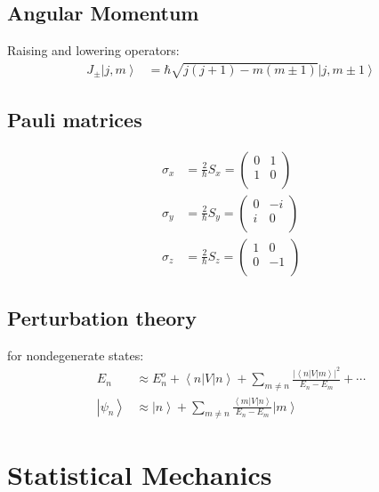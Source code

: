 \documentclass[10pt,twocolumn]{article}
\begin{document}
  \subsection*{Angular Momentum}
  Raising and lowering operators:
  \begin{align*}
    J_\pm \left|j,m\right> &= \hbar\sqrt{j(j+1)-m(m\pm1)}
      \left|j,m\pm1\right>
  \end{align*}
  \subsection*{Pauli matrices}
  \begin{align*}
  \sigma_x&=\frac{2}{\hbar}S_x=\left(
             \begin{array}{cc}
               0 & 1 \\
               1 & 0 \\
             \end{array}
           \right) \\
  \sigma_y&=\frac{2}{\hbar}S_y=\left(
             \begin{array}{cc}
               0 & -i \\
               i & 0 \\
             \end{array}
           \right) \\
  \sigma_z&=\frac{2}{\hbar}S_z=\left(
             \begin{array}{cc}
               1 & 0 \\
               0 & -1 \\
             \end{array}
           \right)
  \end{align*}
  \subsection*{Perturbation theory}
  for nondegenerate states:
  \begin{align*}
    E_n &\approx E_n^o + \left<n\right|V\left|n\right>
      + \sum_{m\ne n}
      \frac{\left|\left<n\right|V\left|m\right>\right|^2}{E_n-E_m}
      + \cdots \\
    \left|\psi_n\right> &\approx \left|n\right> + \sum_{m\ne n}
      \frac{\left<m\right|V\left|n\right>}{E_n-E_m} \left|m\right>
  \end{align*}

  \section{Statistical Mechanics}
\end{document}
